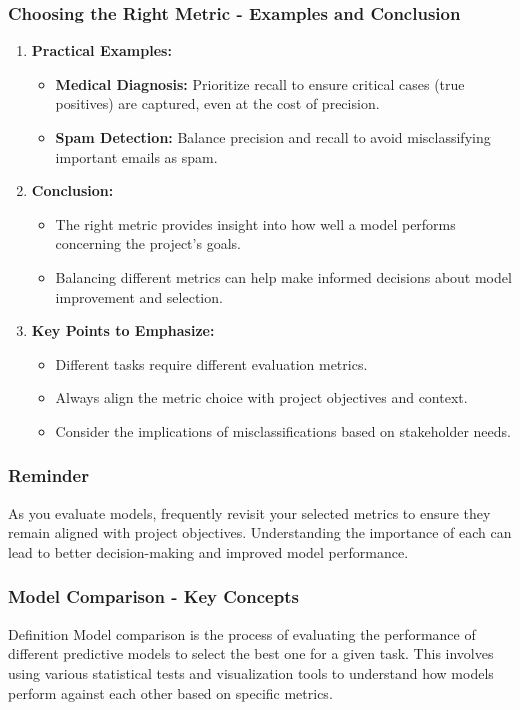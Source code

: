 \documentclass{beamer}
\begin{document}
\begin{frame}[fragile]
    \frametitle{Choosing the Right Metric - Examples and Conclusion}
    \begin{enumerate}
        \item \textbf{Practical Examples:}
            \begin{itemize}
                \item \textbf{Medical Diagnosis:} Prioritize recall to ensure critical cases (true positives) are captured, even at the cost of precision.
                \item \textbf{Spam Detection:} Balance precision and recall to avoid misclassifying important emails as spam.
            \end{itemize}
        \item \textbf{Conclusion:} 
            \begin{itemize}
                \item The right metric provides insight into how well a model performs concerning the project's goals.
                \item Balancing different metrics can help make informed decisions about model improvement and selection.
            \end{itemize}
        \item \textbf{Key Points to Emphasize:}
            \begin{itemize}
                \item Different tasks require different evaluation metrics.
                \item Always align the metric choice with project objectives and context.
                \item Consider the implications of misclassifications based on stakeholder needs.
            \end{itemize}
    \end{enumerate}
\end{frame}

\begin{frame}[fragile]
    \frametitle{Reminder}
    As you evaluate models, frequently revisit your selected metrics to ensure they remain aligned with project objectives. Understanding the importance of each can lead to better decision-making and improved model performance.
\end{frame}

\begin{frame}[fragile]
    \frametitle{Model Comparison - Key Concepts}
    \begin{block}{Definition}
        Model comparison is the process of evaluating the performance of different predictive models to select the best one for a given task. This involves using various statistical tests and visualization tools to understand how models perform against each other based on specific metrics.
    \end{block}
\end{frame}
\end{document}
